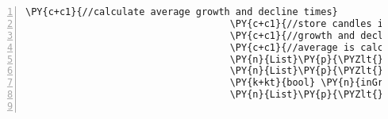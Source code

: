 \begin{Verbatim}[commandchars=\\\{\},numbers=left,firstnumber=1,stepnumber=1,numberblanklines=0]
                                    \PY{c+c1}{//calculate average growth and decline times}
                                    \PY{c+c1}{//store candles in a temporary list to retrieve their times when not in growth/decline anymore}
                                    \PY{c+c1}{//growth and decline times are stored in a list of timespans}
                                    \PY{c+c1}{//average is calculated afterwards}
                                    \PY{n}{List}\PY{p}{\PYZlt{}}\PY{n}{TimeSpan}\PY{p}{\PYZgt{}} \PY{n}{growthTimes} \PY{p}{=} \PY{k}{new} \PY{n}{List}\PY{p}{\PYZlt{}}\PY{n}{TimeSpan}\PY{p}{\PYZgt{}}\PY{p}{(}\PY{p}{)}\PY{p}{;}
                                    \PY{n}{List}\PY{p}{\PYZlt{}}\PY{n}{TimeSpan}\PY{p}{\PYZgt{}} \PY{n}{declineTimes} \PY{p}{=} \PY{k}{new} \PY{n}{List}\PY{p}{\PYZlt{}}\PY{n}{TimeSpan}\PY{p}{\PYZgt{}}\PY{p}{(}\PY{p}{)}\PY{p}{;}
                                    \PY{k+kt}{bool} \PY{n}{inGrowth} \PY{p}{=} \PY{k}{false}\PY{p}{;}
                                    \PY{n}{List}\PY{p}{\PYZlt{}}\PY{n}{Candle}\PY{p}{\PYZgt{}} \PY{n}{growthCandles} \PY{p}{=} \PY{k}{new} \PY{n}{List}\PY{p}{\PYZlt{}}\PY{n}{Candle}\PY{p}{\PYZgt{}}\PY{p}{(}\PY{p}{)}\PY{p}{;}


\end{Verbatim}
